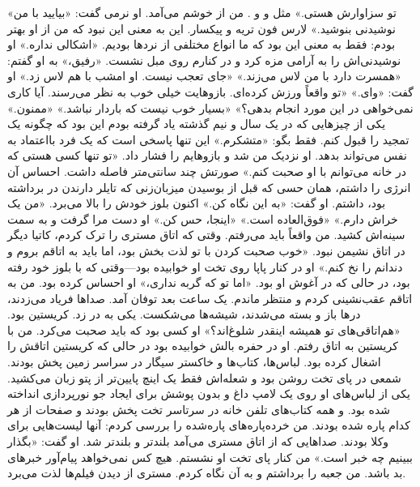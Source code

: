 «تو سزاوارش هستی.» مثل  و  و . من از 
خوشم می‌آمد. او نرمی گفت: «بیایید با من نوشیدنی بنوشید.» لارس فون تریه و پیکسار. این به معنی این نبود که من از او بهتر بودم: فقط به معنی این بود که ما انواع مختلفی از نردها بودیم.
«اشکالی نداره.» او نوشیدنی‌اش را به آرامی مزه کرد و در کنارم روی
مبل نشست. «رفیق،» به او گفتم: «همسرت دارد با من لاس می‌زند.»
«جای تعجب نیست. او امشب با  هم لاس زد.»
او گفت: «وای.» «تو واقعاً ورزش کرده‌ای. بازوهایت خیلی خوب به نظر می‌رسند. آیا کاری نمی‌خواهی در این مورد انجام بدهی؟»
«بسیار خوب نیست که باردار نباشد.»
«ممنون.» یکی از چیزهایی که در یک سال و نیم گذشته یاد گرفته بودم
این بود که چگونه یک تمجید را قبول کنم. فقط بگو: «متشکرم.» این تنها پاسخی است که یک فرد بااعتماد به نفس می‌تواند بدهد.
او نزدیک من شد و بازوهایم را فشار داد. «تو تنها کسی هستی که در خانه می‌توانم با او صحبت کنم.» صورتش چند سانتی‌متر فاصله داشت.
احساس آن انرژی را داشتم، همان حسی که قبل از بوسیدن میزبان‌زنی که تایلر دارندن در  برداشته بود، داشتم.
او گفت: «به این نگاه کن.» اکنون بلوز خودش را بالا می‌برد. «من یک خراش دارم.»
«فوق‌العاده‌ است.» «اینجا، حس کن.» او دست مرا گرفت و به سمت سینه‌اش کشید. من واقعاً باید می‌رفتم. وقتی که اتاق مستری را ترک کردم، کاتیا دیگر در اتاق نشیمن نبود.
«خوب صحبت کردن با تو لذت بخش بود، اما باید به اتاقم بروم و دندانم را نخ کنم.» او در کنار پاپا روی تخت او خوابیده بود—وقتی که با بلوز خود رفته بود، در حالی که در آغوش او بود.
«اما تو که گربه نداری،» او احساس کرده بود. من به اتاقم عقب‌نشینی کردم و منتظر ماندم. یک ساعت بعد توفان آمد.
صداها فریاد می‌زدند، درها باز و بسته می‌شدند، شیشه‌ها می‌شکست.
یکی به در زد.
کریستین بود. «هم‌اتاقی‌های تو همیشه اینقدر شلوغ‌اند؟»
او کسی بود که باید صحبت می‌کرد.
من با کریستین به اتاق  رفتم. او در حفره بالش خوابیده بود در حالی که کریستین اتاقش را اشغال کرده بود. لباس‌ها، کتاب‌ها و خاکستر سیگار در سراسر زمین پخش بودند. شمعی در پای تخت روشن بود و شعله‌اش فقط یک اینچ پایین‌تر از پتو زبان می‌کشید. یکی از لباس‌های او روی یک لامپ داغ و بدون پوشش برای ایجاد جو نورپردازی انداخته شده بود. و همه کتاب‌های تلفن خانه در سرتاسر تخت پخش بودند و صفحات از هر کدام پاره شده بودند. من خرده‌پاره‌های پاره‌شده را بررسی کردم: آنها لیست‌هایی برای وکلا بودند.
صداهایی که از اتاق مستری می‌آمد بلندتر و بلندتر شد.
او گفت: «بگذار ببینیم چه خبر است.»
من کنار پای تخت او نشستم. هیچ کس نمی‌خواهد پیام‌آور خبرهای بد باشد. من جعبه  را برداشتم و به آن نگاه کردم. مستری از دیدن فیلم‌ها لذت می‌برد.